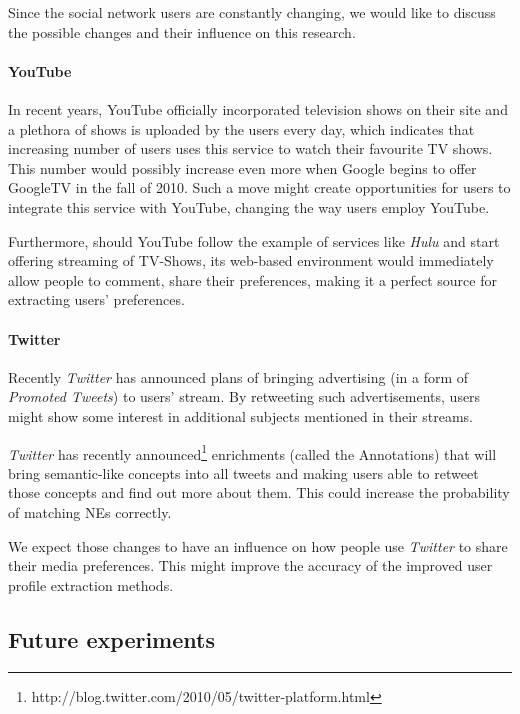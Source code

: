 Since the social network users are constantly changing, we would like to
discuss the possible changes and their influence on this research.

\paragraph{YouTube}

In recent years, YouTube officially incorporated television shows on their
site \cite{youtube-tv-shows} and a plethora of shows is uploaded by the users
every day, which indicates that increasing number of users uses this service to
watch their favourite TV shows. This number would possibly increase even more
when Google begins to offer GoogleTV in the
fall of 2010. Such a move might create opportunities for users to integrate
this service with YouTube, changing the way users employ YouTube.

Furthermore, should YouTube follow the example of services like \textit{Hulu}
and start offering streaming of TV-Shows, its web-based environment would immediately
allow people to comment, share their preferences, making it a perfect source for extracting
users' preferences.

\paragraph{Twitter}

Recently \textit{Twitter} has announced plans of bringing advertising (\eg in a form of
\textit{Promoted Tweets}) to users' stream. By retweeting such advertisements,
users might show some interest in additional subjects mentioned in their
streams.

\textit{Twitter} has recently announced\footnote{http://blog.twitter.com/2010/05/twitter-platform.html}
enrichments (called the Annotations) that will bring semantic-like concepts
into all tweets and making users able to retweet those concepts and find
out more about them. This could increase the probability of matching NEs correctly.

We expect those changes to have an influence on how people use \textit{Twitter}
to share their media preferences. This might improve the accuracy of the improved
user profile extraction methods.

\subsection{Future experiments}

